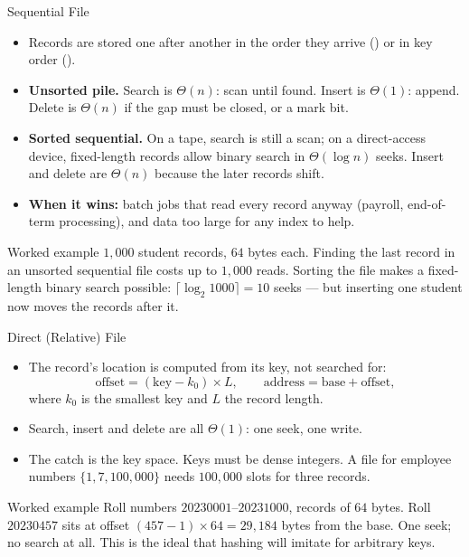 \documentclass[aspectratio=169]{beamer}
\begin{document}
\begin{frame}{Sequential File}
  \begin{itemize}
    \item Records are stored one after another in the order they arrive
      () or in key order ().
    \item \textbf{Unsorted pile.} Search is $\Theta(n)$: scan until found.
      Insert is $\Theta(1)$: append. Delete is $\Theta(n)$ if the gap must be
      closed, or a mark bit.
    \item \textbf{Sorted sequential.} On a tape, search is still a scan; on a
      direct-access device, fixed-length records allow binary search in
      $\Theta(\log n)$ seeks. Insert and delete are $\Theta(n)$ because the
      later records shift.
    \item \textbf{When it wins:} batch jobs that read every record anyway
      (payroll, end-of-term processing), and data too large for any index to
      help.
  \end{itemize}
  \begin{exampleblock}{Worked example}
    $1{,}000$ student records, $64$ bytes each. Finding the last record in an
    unsorted sequential file costs up to $1{,}000$ reads. Sorting the file
    makes a fixed-length binary search possible: $\lceil\log_2 1000\rceil =
    10$ seeks --- but inserting one student now moves the records after it.
  \end{exampleblock}
\end{frame}

\begin{frame}{Direct (Relative) File}
  \begin{itemize}
    \item The record's location is computed from its key, not searched for:
      \[
        \text{offset} = (\text{key} - k_0)\times L,
        \qquad \text{address} = \text{base} + \text{offset},
      \]
      where $k_0$ is the smallest key and $L$ the record length.
    \item Search, insert and delete are all $\Theta(1)$: one seek, one write.
    \item The catch is the key space. Keys must be dense integers. A file for
      employee numbers $\{1, 7, 100{,}000\}$ needs $100{,}000$ slots for three
      records.
  \end{itemize}
  \begin{exampleblock}{Worked example}
    Roll numbers $20230001$--$20231000$, records of $64$ bytes. Roll
    $20230457$ sits at offset $(457-1)\times 64 = 29{,}184$ bytes from the
    base. One seek; no search at all. This is the ideal that hashing will
    imitate for arbitrary keys.
  \end{exampleblock}
\end{frame}
\end{document}
